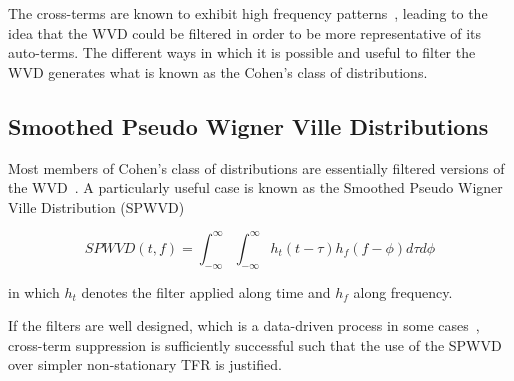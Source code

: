 The cross-terms are known to exhibit high frequency patterns~\cite{martin_lol},
leading to the idea that the WVD could be filtered in order to be more
representative of its auto-terms. The different ways in which it is possible
and useful to filter the WVD generates what is known as the Cohen's class of
distributions.

\subsection{Smoothed Pseudo Wigner Ville Distributions}

Most members of Cohen's class of distributions are essentially filtered
versions of the WVD~\cite{}. A particularly useful case is known as the
Smoothed Pseudo Wigner Ville Distribution (SPWVD)

$$ SPWVD(t, f) = \int_{-\infty}^{\infty}\int_{-\infty}^{\infty} h_t (t - \tau) h_f(f - \phi)d\tau d\phi$$

in which $h_t$ denotes the filter applied along time and $h_f$ along frequency.

If the filters are well designed, which is a data-driven process in some
cases~\cite{}, cross-term suppression is sufficiently successful such that
the use of the SPWVD over simpler non-stationary TFR is justified.
